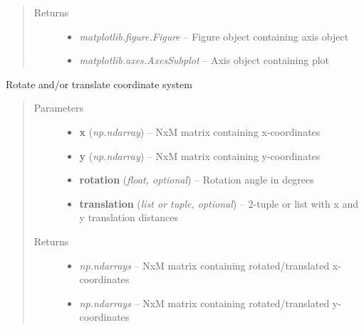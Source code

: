 \documentclass[letterpaper,10pt,english]{sphinxmanual}
\begin{document}
\begin{fulllineitems}
\begin{quote}
\begin{description}
\begin{itemize}
\end{itemize}

\item[{Returns}] \leavevmode
\begin{itemize}
\item {} 
\emph{matplotlib.figure.Figure} --
Figure object containing axis object

\item {} 
\emph{matplotlib.axes.AxesSubplot} --
Axis object containing plot

\end{itemize}


\end{description}\end{quote}

\end{fulllineitems}


\begin{fulllineitems}
\label{flamingo/rectification/index:flamingo.rectification.plot.rotate_translate}
Rotate and/or translate coordinate system
\begin{quote}\begin{description}
\item[{Parameters}] \leavevmode\begin{itemize}
\item {} 
\textbf{x} (\emph{np.ndarray}) -- NxM matrix containing x-coordinates

\item {} 
\textbf{y} (\emph{np.ndarray}) -- NxM matrix containing y-coordinates

\item {} 
\textbf{rotation} (\emph{float, optional}) -- Rotation angle in degrees

\item {} 
\textbf{translation} (\emph{list or tuple, optional}) -- 2-tuple or list with x and y translation distances

\end{itemize}

\item[{Returns}] \leavevmode
\begin{itemize}
\item {} 
\emph{np.ndarrays} --
NxM matrix containing rotated/translated x-coordinates

\item {} 
\emph{np.ndarrays} --
NxM matrix containing rotated/translated y-coordinates

\end{itemize}


\end{description}\end{quote}

\end{fulllineitems}
\end{document}
